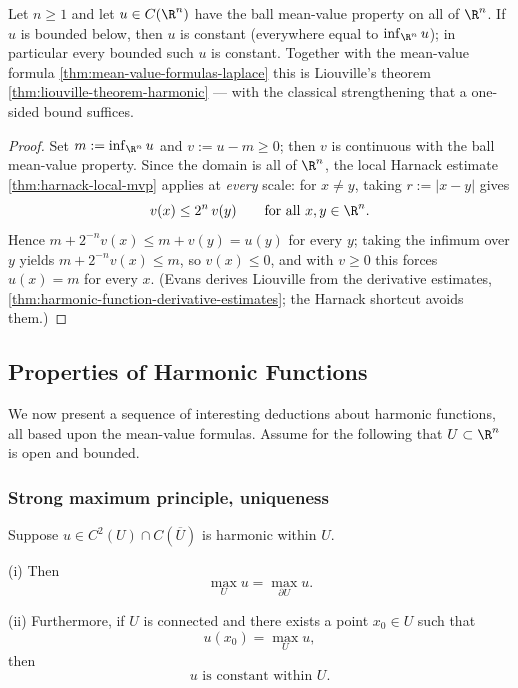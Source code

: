 \begin{theorem}
\label{thm:liouville-mvp}
\leanok
Let $n \ge 1$ and let $u \in C(\R^n)$ have the ball mean-value property on all of
$\R^n$. If $u$ is bounded below, then $u$ is constant (everywhere equal to
$\inf_{\R^n} u$); in particular every bounded such $u$ is constant. Together with the
mean-value formula \cref{thm:mean-value-formulas-laplace} this is Liouville's theorem
\cref{thm:liouville-theorem-harmonic} — with the classical strengthening that a
one-sided bound suffices.
\end{theorem}

\begin{proof}
\leanok
Set $m := \inf_{\R^n} u$ and $v := u - m \ge 0$; then $v$ is continuous with the ball
mean-value property. Since the domain is all of $\R^n$, the local Harnack estimate
\cref{thm:harnack-local-mvp} applies at \emph{every} scale: for $x \neq y$, taking
$r := |x - y|$ gives
$$v(x) \le 2^n\, v(y) \qquad \text{for all } x, y \in \R^n.$$
Hence $m + 2^{-n} v(x) \le m + v(y) = u(y)$ for every $y$; taking the infimum over $y$
yields $m + 2^{-n} v(x) \le m$, so $v(x) \le 0$, and with $v \ge 0$ this forces
$u(x) = m$ for every $x$. (Evans derives Liouville from the derivative estimates,
\cref{thm:harmonic-function-derivative-estimates}; the Harnack shortcut avoids them.)
\end{proof}

\subsection{Properties of Harmonic Functions}
\label{sec:laplace-properties-harmonic-functions}

We now present a sequence of interesting deductions about harmonic functions, all based upon the mean-value formulas. Assume for the following that $U \subset \R^n$ is open and bounded.

\subsubsection{Strong maximum principle, uniqueness}
\label{sec:laplace-strong-maximum-principle}

\begin{theorem}
\label{thm:strong-maximum-principle-laplace}
Suppose $u \in C^2(U) \cap C(\overline{U})$ is harmonic within $U$.

(i) Then
$$\max_U u = \max_{\partial U} u.$$

(ii) Furthermore, if $U$ is connected and there exists a point $x_0 \in U$ such that
$$u(x_0) = \max_U u,$$
then
$$u \text{ is constant within } U.$$
\end{theorem}

